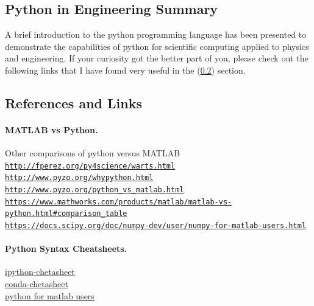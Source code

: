 \documentclass[%
oneside,                 %
final,                   %
10pt]{article}
\begin{document}
\subsection{Python in Engineering Summary}

A brief introduction to the python programming language has been presented to demonstrate the capabilities of python for scientific computing applied to physics and engineering. If your curiosity got the better part of you, please check out the following links that I have found very useful in the (\ref{sec:reflinks}) section.


\subsection{References and Links}
\label{sec:reflinks}


\paragraph{MATLAB vs Python.}
Other comparisons of python versus MATLAB  \\
\href{{http://fperez.org/py4science/warts.html}}{\nolinkurl{http://fperez.org/py4science/warts.html}} \\
\href{{http://www.pyzo.org/whypython.html}}{\nolinkurl{http://www.pyzo.org/whypython.html}} \\
\href{{http://www.pyzo.org/python_vs_matlab.html}}{\nolinkurl{http://www.pyzo.org/python_vs_matlab.html}} \\
\href{{https://www.mathworks.com/products/matlab/matlab-vs-python.html#comparison_table}}{\nolinkurl{https://www.mathworks.com/products/matlab/matlab-vs-python.html\#comparison_table}} \\
\href{{https://docs.scipy.org/doc/numpy-dev/user/numpy-for-matlab-users.html}}{\nolinkurl{https://docs.scipy.org/doc/numpy-dev/user/numpy-for-matlab-users.html}} \\



\paragraph{Python Syntax Cheatsheets.}
\href{{https://damontallen.github.io/IPython-quick-ref-sheets/}}{ipython-chetasheet} \\
\href{{http://conda.pydata.org/docs/using/cheatsheet.html}}{conda-chetasheet} \\
\href{{http://mathesaurus.sourceforge.net/matlab-numpy.html}}{python for matlab users} \\
\end{document}
